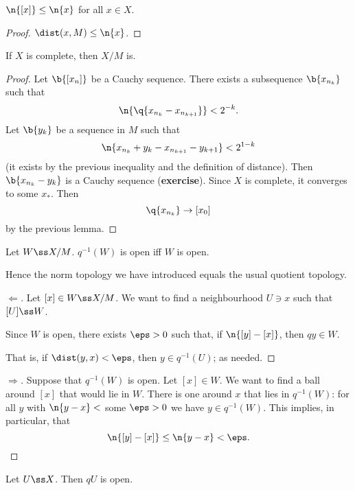 \begin{lemma}
  $\n{[x]} \le \n{x}$ for all $x \in X$.
\end{lemma}

\begin{proof}
  $\dist(x, M) \le \n{x}$.
\end{proof}

\begin{lemma}
  If $X$ is complete, then $X/M$ is.
\end{lemma}

\begin{proof}
  Let $\b{[x_n]}$ be a Cauchy sequence.
  There exists a subsequence $\b{x_{n_k}}$ such that
  $$ \n{\q{x_{n_k}-x_{n_{k+1}}}} < 2^{-k}. $$
  Let $\b{y_k}$ be a sequence in $M$ such that
  $$ \n{x_{n_k}+y_k-x_{n_{k+1}}-y_{k+1}} < 2^{1-k} $$
  (it exists by the previous inequality and the definition of distance).
  Then $\b{x_{n_k}-y_k}$ is a Cauchy sequence (\textbf{exercise}).
  Since $X$ is complete, it converges to some $x_*$.
  Then
  $$ \q{x_{n_k}} \to [x_0] $$
  by the previous lemma.
\end{proof}

\begin{lemma}
  Let $W \ss X/M$.
  $q^{-1}(W)$ is open iff $W$ is open.
\end{lemma}

Hence the norm topology we have introduced equals the usual quotient topology.

\begin{proof}[$\Leftarrow$]
  Let $[x] \in W \ss X/M$.
  We want to find a neighbourhood $U \ni x$ such that $[U] \ss W$.
  
  Since $W$ is open,
  there exists $\eps > 0$ such that, if $\n{[y]-[x]}$, then $qy \in W$.
  
  That is, if $\dist(y, x) < \eps$, then $y \in q^{-1}(U)$; as needed.
\end{proof}

\begin{proof}[$\Rightarrow$]
  Suppose that $q^{-1}(W)$ is open.
  Let $[x] \in W$.
  We want to find a ball around $[x]$ that would lie in $W$.
  There is one around $x$ that lies in $q^{-1}(W)$: for all $y$ with $\n{y-x}<$ some $\eps > 0$ we have $y \in q^{-1}(W)$.
  This implies, in particular, that
  $$ \n{[y]-[x]} \le \n{y-x} < \eps. $$
\end{proof}

\begin{lemma}
  Let $U \ss X$.
  Then $qU$ is open.
\end{lemma}

